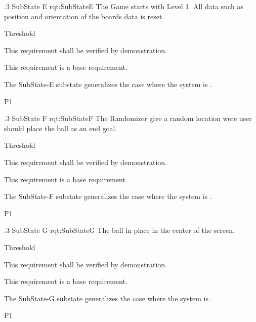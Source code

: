 \ONERQMTV
{\RqtNumberBase.3}
{SubState E}
{rqt:SubStateE}
{The Game starts with Level 1. All data such as position and orientation of the boards data is reset.}
{
	\item [Phase 1] Threshold
}
{This requirement shall be verified by demonstration.}
{
	\item [N/A] This requirement is a base requirement.
}
{
	\item The SubState-E substate generalizes the case where the system is \TBD.
}
{P1}

\ONERQMTV
{\RqtNumberBase.3}
{SubState F}
{rqt:SubStateF}
{The Randomizer give a random location were user should place the ball as an end goal.}
{
	\item [Phase 1] Threshold
}
{This requirement shall be verified by demonstration.}
{
	\item [N/A] This requirement is a base requirement.
}
{
	\item The SubState-F substate generalizes the case where the system is \TBD.
}
{P1}

\ONERQMTV
{\RqtNumberBase.3}
{SubState G}
{rqt:SubStateG}
{The ball in place in the center of the screen. }
{
	\item [Phase 1] Threshold
}
{This requirement shall be verified by demonstration.}
{
	\item [N/A] This requirement is a base requirement.
}
{
	\item The SubState-G substate generalizes the case where the system is \TBD.
}
{P1}

